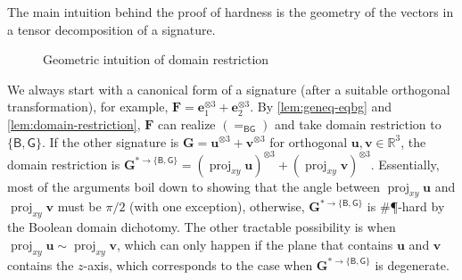 \documentclass[11pt]{article}
\DeclareMathOperator{\proj}{proj}
\newcommand{\db}{\mathsf{B}}
\newcommand{\dg}{\mathsf{G}}
\newcommand{\sph}{\#\P-hard\xspace}
\newcommand{\teh}{^{\otimes 3}}
\newcommand{\domres}[1]{
  ^{*\to\{#1\}}
}
\begin{document}
The main intuition behind the proof of hardness is the geometry of the vectors in a tensor decomposition of a signature.
\begin{figure}
  \centering
\caption{Geometric intuition of domain restriction}\label{fig:geometric-intuition}
\end{figure}
We always start with a canonical form of a signature (after a suitable orthogonal
transformation), for example, $\mathbf{F} = \mathbf{e}_1\teh + \mathbf{e}_2\teh$.
By \cref{lem:geneq-eqbg} and \cref{lem:domain-restriction}, $\mathbf{F}$ can realize $(=_{\db \dg})$ and take domain restriction to $\{\db, \dg\}$.
If the other signature is $\mathbf{G} = \mathbf{u}\teh + \mathbf{v}\teh$ for orthogonal $\mathbf{u},\mathbf{v} \in \mathbb{R}^3$,
the domain restriction is $\mathbf{G}\domres{\db, \dg} = (\proj_{xy} \mathbf{u})\teh + (\proj_{xy} \mathbf{v})\teh$.
Essentially, most of the arguments boil down to showing that the angle between $\proj_{xy} \mathbf{u}$ and $\proj_{xy} \mathbf{v}$ must be $\pi/2$ (with one exception), otherwise, 
$\mathbf{G}\domres{\db, \dg}$ is \sph by the Boolean domain dichotomy.
The other tractable possibility is when $\proj_{xy} \mathbf{u} \sim \proj_{xy} \mathbf{v}$, which can only happen if the plane that contains $\mathbf{u}$ and $\mathbf{v}$ contains the $z$-axis, which corresponds to the case when $\mathbf{G}\domres{\db, \dg}$ is degenerate.

 
\end{document}
